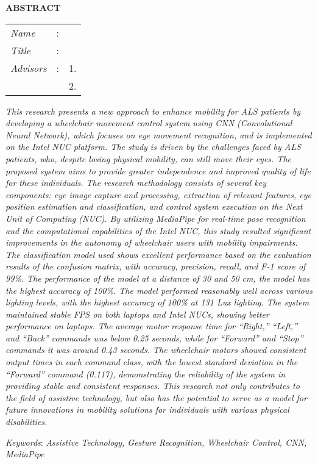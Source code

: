 \begin{center}
  \large\textbf{ABSTRACT}
\end{center}


\vspace{2ex}

\begingroup
\setlength{\tabcolsep}{0pt}

\noindent
\begin{tabularx}{\textwidth}{l >{\centering}m{3em} X}
  \emph{Name}     & : & \name{}         \\

  \emph{Title}    & : & \engtatitle{}   \\

  \emph{Advisors} & : & 1. \advisor{}   \\
                  &   & 2. \coadvisor{} \\
\end{tabularx}
\endgroup

\emph{This research presents a new approach to enhance mobility for ALS patients by developing a wheelchair movement control system using CNN (Convolutional Neural Network), which focuses on eye movement recognition, and is implemented on the Intel NUC platform. The study is driven by the challenges faced by ALS patients, who, despite losing physical mobility, can still move their eyes. The proposed system aims to provide greater independence and improved quality of life for these individuals. The research methodology consists of several key components: eye image capture and processing, extraction of relevant features, eye position estimation and classification, and control system execution on the Next Unit of Computing (NUC). By utilizing MediaPipe for real-time pose recognition and the computational capabilities of the Intel NUC, this study resulted significant improvements in the autonomy of wheelchair users with mobility impairments. The classification model used shows excellent performance based on the evaluation results of the confusion matrix, with accuracy, precision, recall, and F-1 score of 99\%. The performance of the model at a distance of 30 and 50 cm, the model has the highest accuracy of 100\%. The model performed reasonably well across various lighting levels, with the highest accuracy of 100\% at 131 Lux lighting. The system maintained stable FPS on both laptops and Intel NUCs, showing better performance on laptops. The average motor response time for “Right,” “Left,” and “Back” commands was below 0.25 seconds, while for “Forward” and “Stop” commands it was around 0.43 seconds. The wheelchair motors showed consistent output times in each command class, with the lowest standard deviation in the “Forward” command (0.117), demonstrating the reliability of the system in providing stable and consistent responses. This research not only contributes to the field of assistive technology, but also has the potential to serve as a model for future innovations in mobility solutions for individuals with various physical disabilities.}

\emph{Keywords}: \emph{Assistive Technology, Gesture Recognition, Wheelchair Control, CNN, MediaPipe}